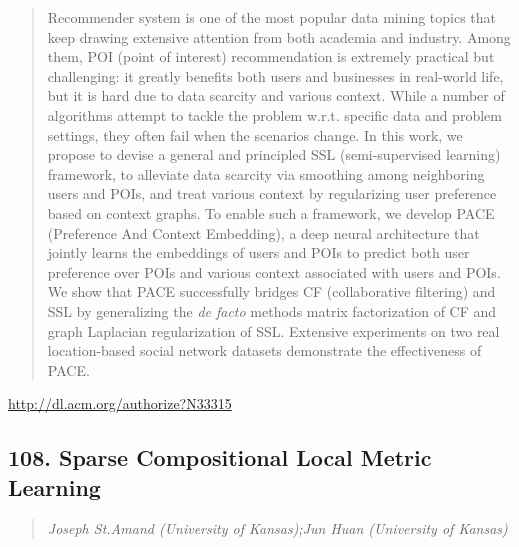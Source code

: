\documentclass{article}
\begin{document}
\begin{quote}
Recommender system is one of the most popular data mining topics that keep drawing extensive attention from both academia and industry. Among them, POI (point of interest) recommendation is extremely practical but challenging: it greatly benefits both users and businesses in real-world life, but it is hard due to data scarcity and various context. While a number of algorithms attempt to tackle the problem w.r.t. specific data and problem settings, they often fail when the scenarios change. In this work, we propose to devise a general and principled SSL (semi-supervised learning) framework, to alleviate data scarcity via smoothing among neighboring users and POIs, and treat various context by regularizing user preference based on context graphs. To enable such a framework, we develop PACE (Preference And Context Embedding), a deep neural architecture that jointly learns the embeddings of users and POIs to predict both user preference over POIs and various context associated with users and POIs. We show that PACE successfully bridges CF (collaborative filtering) and SSL by generalizing the \textit{de facto} methods matrix factorization of CF and graph Laplacian regularization of SSL. Extensive experiments on two real location-based social network datasets demonstrate the effectiveness of PACE.
\end{quote}

\href{http://dl.acm.org/authorize?N33315}{http://dl.acm.org/authorize?N33315}

\subsection{108. Sparse Compositional Local Metric Learning}

\begin{quote}
\footnotesize{\textit{Joseph St.Amand (University of Kansas);Jun Huan (University of Kansas)}}

\end{quote}
\end{document}
